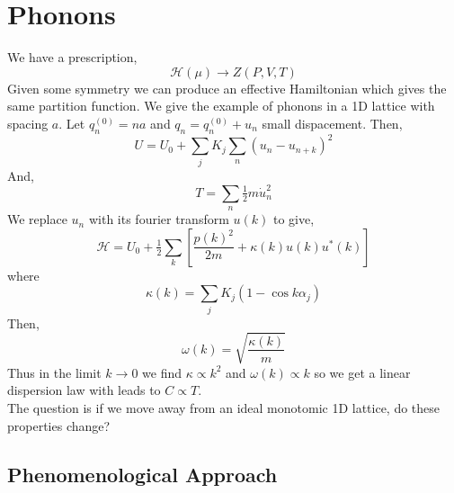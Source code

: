 \documentclass[12pt]{article}
\renewcommand{\H}{\mathcal{H}}
\begin{document}
\section{Phonons}

We have a prescription,
\[ \mathcal{H}(\mu) \to Z(P,V,T) \]
Given some symmetry we can produce an effective Hamiltonian which gives the same partition function. We give the example of phonons in a 1D lattice with spacing $a$. Let $q_n^{(0)} = na$ and $q_n = q_{n}^{(0)} + u_n$ small dispacement.
Then,
\[ U = U_0 +  \sum_{j} K_j \sum_{n} (u_n - u_{n + k})^2 \]
And,
\[ T = \sum_n \tfrac{1}{2} m \dot{u}_n^2 \]
We replace $u_n$ with its fourier transform $u(k)$ to give,
\[ \H = U_0 + \tfrac{1}{2} \sum_k \left[ \frac{p(k)^2}{2m} + \kappa(k) u(k) u^*(k) \right] \]
where
\[ \kappa(k) = \sum_j K_j (1 - \cos{k \alpha_j}) \]
Then,
\[ \omega(k) = \sqrt{\frac{\kappa(k)}{m}} \]
Thus in the limit $k \to 0$ we find $\kappa \propto k^2$ and $\omega(k) \propto k$ so we get a linear dispersion law with leads to $C \propto T$. 
\bigskip\\
The question is if we move away from an ideal monotomic 1D lattice, do these properties change?

\subsection{Phenomenological Approach}
\end{document}
